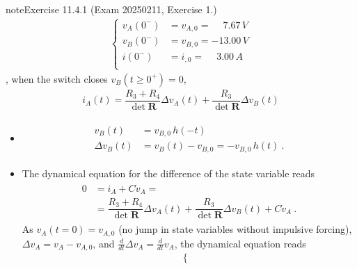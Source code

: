 \documentclass[letterpaper,10pt,english]{jupyterBook}
\begin{document}
\begin{sphinxadmonition}{note}{Exercise 11.4.1 (Exam 2025\sphinxhyphen{}02\sphinxhyphen{}11, Exercise 1.)}
\begin{equation*}
\begin{split}\begin{cases}
  v_A(0^-) & = v_{A,0} = \quad\ 7.67 \, V \\
  v_B(0^-) & = v_{B,0} =      -13.00 \, V \\
    i(0^-) & = i_{ ,0} = \quad\ 3.00 \, A \\
\end{cases}\end{split}
\end{equation*}
\sphinxAtStartPar
{}, when the switch closes \(v_B(t \ge 0^+) = 0\),
\begin{equation*}
\begin{split}i_A(t) = \dfrac{R_3 + R_4}{\det \mathbf{R}} \Delta v_A(t) + \dfrac{R_3}{\det \mathbf{R}} \Delta v_B(t)\end{split}
\end{equation*}\begin{itemize}
\item {} 
\sphinxAtStartPar
{}
\begin{equation*}
\begin{split}\begin{aligned}
     v_{B}(t) & = v_{B,0} \, h(-t) \\
     \Delta v_{B}(t) & = v_B(t) - v_{B,0} = - v_{B,0} \, h(t) \ . 
   \end{aligned}\end{split}
\end{equation*}
\item {} 
\sphinxAtStartPar
{} The dynamical equation for the difference of the state variable reads
\begin{equation*}
\begin{split}\begin{aligned}
     0 & = i_A + C \dot{v}_A = \\
       & = \dfrac{R_3 + R_4}{\det \mathbf{R}} \Delta v_A(t) + \dfrac{R_3}{\det \mathbf{R}} \Delta v_B(t) + C \dot{v}_A \ .
   \end{aligned}\end{split}
\end{equation*}
\sphinxAtStartPar
As \(v_{A}(t=0) = v_{A,0}\) (no jump in state variables without impulsive forcing), \(\Delta v_A = v_A - v_{A,0}\), and \(\frac{d}{dt} \Delta v_A = \frac{d}{dt} v_A\), the dynamical equation reads
\begin{equation*}
\begin{split}\begin{cases}

\end{cases}
\end{split}
\end{equation*}
\end{itemize}
\end{sphinxadmonition}
\end{document}
